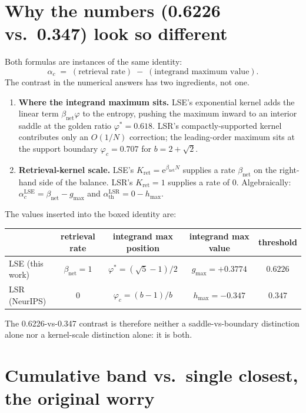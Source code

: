 \documentclass[11pt]{article}
\newcommand{\Bnet}{\beta_{\mathrm{net}}}
\newcommand{\athLSR}{\alpha_{\mathrm{th}}^{\mathrm{LSR}}}
\newcommand{\acLSE}{\alpha_c^{\mathrm{LSE}}}
\begin{document}
\section{Why the numbers (0.6226 vs.\ 0.347) look so different}

Both formulas are instances of the same identity:
\begin{equation}
\boxed{\;\alpha_c \;=\; (\text{retrieval rate}) \;-\; (\text{integrand maximum value}).\;}
\end{equation}
The contrast in the numerical answers has two ingredients, not one.
\begin{enumerate}
  \item \textbf{Where the integrand maximum sits.}
        LSE's exponential kernel adds the linear term $\Bnet\varphi$ to
        the entropy, pushing the maximum inward to an interior saddle at
        the golden ratio $\varphi^{*}=0.618$. LSR's compactly-supported
        kernel contributes only an $O(1/N)$ correction; the leading-order
        maximum sits at the support boundary $\varphi_c = 0.707$ for
        $b = 2+\sqrt{2}$.
  \item \textbf{Retrieval-kernel scale.}
        LSE's $K_{\mathrm{ret}} = \mathrm{e}^{\Bnet N}$ supplies a rate
        $\Bnet$ on the right-hand side of the balance. LSR's
        $K_{\mathrm{ret}} = 1$ supplies a rate of $0$. Algebraically:
        $\acLSE = \Bnet - g_{\max}$ and $\athLSR = 0 - h_{\max}$.
\end{enumerate}

The values inserted into the boxed identity are:
\begin{center}
\renewcommand{\arraystretch}{1.3}
\begin{tabular}{lcccc}
\hline
                  & retrieval rate & integrand max position & integrand max value & threshold \\
\hline
LSE (this work)   & $\Bnet = 1$ & $\varphi^{*} = (\sqrt{5}-1)/2$ & $g_{\max} = +0.3774$ & $0.6226$ \\
LSR (NeurIPS)     & $0$         & $\varphi_c = (b-1)/b$          & $h_{\max} = -0.347$  & $0.347$ \\
\hline
\end{tabular}
\end{center}

The 0.6226-vs-0.347 contrast is therefore neither a saddle-vs-boundary
distinction alone nor a kernel-scale distinction alone: it is both.

\section{Cumulative band vs.\ single closest, the original worry}
\end{document}
